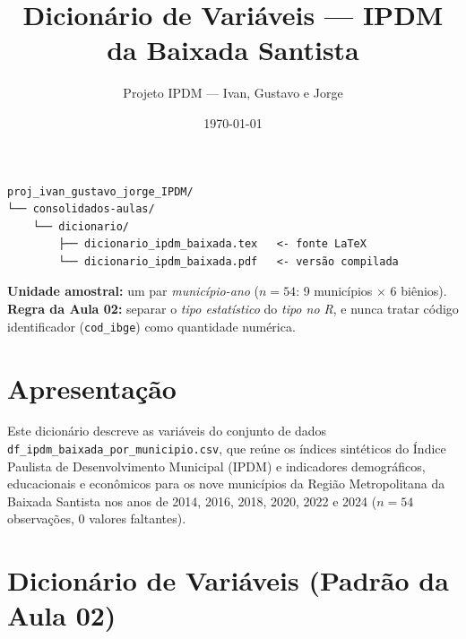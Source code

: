 \documentclass[11pt,a4paper]{article}
\title{Dicionário de Variáveis --- IPDM da Baixada Santista}
\author{Projeto IPDM --- Ivan, Gustavo e Jorge}
\date{\today}
\begin{document}
\maketitle
\begin{tcolorbox}[
  colback=blue!5!white,
  colframe=blue!60!black,
  coltitle=white,
  title=Localização deste arquivo e papel na Aula 02,
  fonttitle=\bfseries,
  boxrule=1pt,
  arc=3pt,
  left=6pt, right=6pt, top=6pt, bottom=6pt
]
\begin{verbatim}
proj_ivan_gustavo_jorge_IPDM/
└── consolidados-aulas/
    └── dicionario/
        ├── dicionario_ipdm_baixada.tex   <- fonte LaTeX
        └── dicionario_ipdm_baixada.pdf   <- versão compilada
\end{verbatim}
\small\textbf{Unidade amostral:} um par \emph{município-ano} ($n = 54$: 9 municípios $\times$ 6 biênios).\\
\textbf{Regra da Aula 02:} separar o \emph{tipo estatístico} do \emph{tipo no R}, e nunca tratar código identificador (\texttt{cod\_ibge}) como quantidade numérica.
\end{tcolorbox}

\section*{Apresentação}
Este dicionário descreve as variáveis do conjunto de dados \texttt{df\_ipdm\_baixada\_por\_municipio.csv}, que reúne os índices sintéticos do Índice Paulista de Desenvolvimento Municipal (IPDM) e indicadores demográficos, educacionais e econômicos para os nove municípios da Região Metropolitana da Baixada Santista nos anos de 2014, 2016, 2018, 2020, 2022 e 2024 ($n = 54$ observações, $0$ valores faltantes).

\section*{Dicionário de Variáveis (Padrão da Aula 02)}
\end{document}
